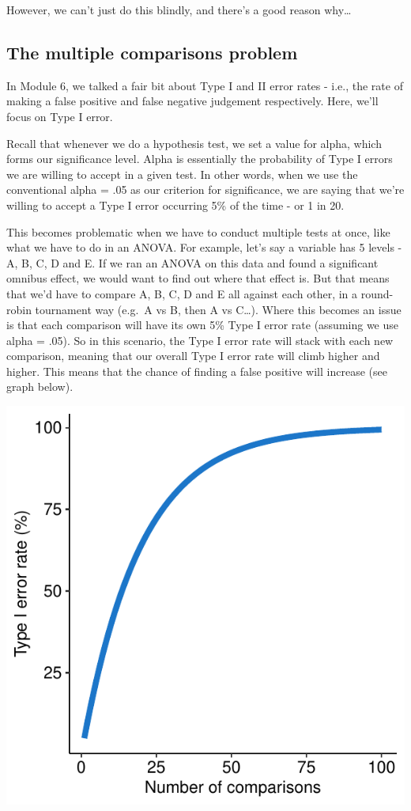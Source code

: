 \documentclass[
]{book}
\begin{document}
However, we can't just do this blindly, and there's a good reason why\ldots{}

\subsection{The multiple comparisons problem}\label{the-multiple-comparisons-problem}

In Module 6, we talked a fair bit about Type I and II error rates -
i.e., the rate of making a false positive and false negative judgement
respectively. Here, we'll focus on Type I error.

Recall that whenever we do a hypothesis test, we set a value for alpha,
which forms our significance level. Alpha is essentially the probability
of Type I errors we are willing to accept in a given test. In other
words, when we use the conventional alpha = .05 as our criterion for
significance, we are saying that we're willing to accept a Type I error
occurring 5\% of the time - or 1 in 20.

This becomes problematic when we have to conduct multiple tests at once,
like what we have to do in an ANOVA. For example, let's say a variable
has 5 levels - A, B, C, D and E. If we ran an ANOVA on this data and
found a significant omnibus effect, we would want to find out where that
effect is. But that means that we'd have to compare A, B, C, D and E all
against each other, in a round-robin tournament way (e.g.~A vs B, then A
vs C\ldots). Where this becomes an issue is that each comparison will have
its own 5\% Type I error rate (assuming we use alpha = .05). So in this
scenario, the Type I error rate will stack with each new comparison,
meaning that our overall Type I error rate will climb higher and higher.
This means that the chance of finding a false positive will increase
(see graph below).

\begin{center}\includegraphics{_main_files/figure-latex/unnamed-chunk-172-1} \end{center}
\end{document}
